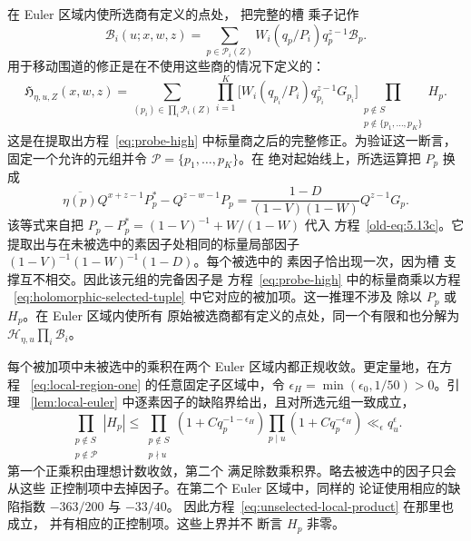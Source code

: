 \documentclass[11pt,a4paper]{article}
\numberwithin{equation}{section}
\numberwithin{figure}{section}
\theoremstyle{definition}
\theoremstyle{remark}
\begin{document}
在 Euler 区域内使所选商有定义的点处，
把完整的槽
乘子记作
\[
 \mathcal B_i(u;x,w,z)=\sum_{p\in\mathcal P_i(Z)}
           W_i(q_p/P_i)q_p^{z-1}\mathcal B_p.
\]
用于移动围道的修正是在不使用这些商的情况下定义的：
\begin{equation}\label{eq:holomorphic-selected-tuple}
 \mathfrak H_{\eta,u,Z}(x,w,z)=
 \sum_{(p_i)\in\prod_i\mathcal P_i(Z)}
 \prod_{i=1}^K\bigl[W_i(q_{p_i}/P_i)q_{p_i}^{z-1}G_{p_i}\bigr]
 \prod_{\substack{p\notin S\\p\notin\{p_1,\ldots,p_K\}}}H_p.
\end{equation}
这是在提取出方程~\eqref{eq:probe-high} 中标量商之后的完整修正。为验证这一断言，
固定一个允许的元组并令 $\mathcal P=\{p_1,\ldots,p_K\}$。在
绝对起始线上，所选运算把 $P_p$ 换成
\begin{equation}\label{eq:selected-local-operation}
 \overline{\eta(p)}Q^{x+z-1}P_p^*-Q^{z-w-1}P_p
 =\frac{1-D}{(1-V)(1-W)}Q^{z-1}G_p.
\end{equation}
该等式来自把
$P_p-P_p^*=(1-V)^{-1}+W/(1-W)$ 代入
方程~\eqref{old-eq:5.13c}。它提取出与在未被选中的素因子处相同的标量局部因子
$(1-V)^{-1}(1-W)^{-1}(1-D)$。每个被选中的
素因子恰出现一次，因为槽
支撑互不相交。因此该元组的完备因子是
方程~\eqref{eq:probe-high} 中的标量商乘以方程
~\eqref{eq:holomorphic-selected-tuple} 中它对应的被加项。这一推理不涉及
除以 $P_p$ 或 $H_p$。在 Euler 区域内使所有
原始被选商都有定义的点处，同一个有限和也分解为
$\mathcal H_{\eta,u}\prod_i\mathcal B_i$。

每个被加项中未被选中的乘积在两个 Euler
区域内都正规收敛。更定量地，在方程
~\eqref{eq:local-region-one} 的任意固定子区域中，令
$\epsilon_H=\min(\epsilon_0,1/50)>0$。引理
~\ref{lem:local-euler} 中逐素因子的缺陷界给出，且对所选元组一致成立，
\begin{equation}\label{eq:unselected-local-product}
 \prod_{\substack{p\notin S\\p\notin\mathcal P}}|H_p|
 \le
 \prod_{\substack{p\notin S\\p\nmid u}}
       (1+Cq_p^{-1-\epsilon_H})
 \prod_{p\mid u}(1+Cq_p^{-\epsilon_H})
 \ll_\epsilon q_u^\epsilon.
\end{equation}
第一个正乘积由理想计数收敛，第二个
满足除数乘积界。略去被选中的因子只会从这些
正控制项中去掉因子。在第二个 Euler 区域中，同样的
论证使用相应的缺陷指数 $-363/200$ 与 $-33/40$。
因此方程~\eqref{eq:unselected-local-product} 在那里也成立，
并有相应的正控制项。这些上界并不
断言 $H_p$ 非零。
\end{document}
